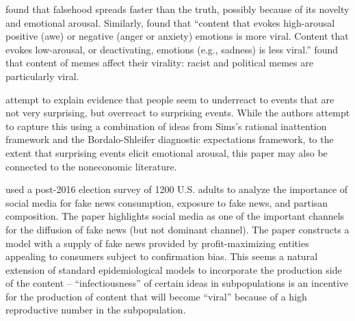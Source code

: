 

\href{https://science.sciencemag.org/content/359/6380/1146}{\cite{vosoughi_spread_2018}} found that falsehood spreads faster than the truth, possibly because of its novelty and emotional arousal.  Similarly, \href{https://journals.sagepub.com/doi/10.1509/jmr.10.0353}{\cite{berger2012makes}} found that ``content that evokes high-arousal positive (awe) or negative (anger or anxiety) emotions is more viral. Content that evokes low-arousal, or deactivating, emotions (e.g., sadness) is less viral.'' \href{https://arxiv.org/abs/1805.12512}{\cite{zannettou2018origins}} found that content of memes affect their virality: racist and political memes are particularly viral.

\cite{kohlhasasymmetric} attempt to explain evidence that people seem to underreact to events that are not very surprising, but overreact to surprising events.  While the authors attempt to capture this using a combination of ideas from Sims's rational inattention framework and the Bordalo-Shleifer diagnostic expectations framework, to the extent that surprising events elicit emotional arousal, this paper may also be connected to the noneconomic literature.  %


\href{https://github.com/iworld1991/EpiExp/blob/master/Literature/allcott2017social.pdf}{\cite{allcott2017social}} used a post-2016 election survey of 1200 U.S. adults to analyze the importance of social media for fake news consumption, exposure to fake news, and partisan composition. The paper highlights social media as one of the important channels for the diffusion of fake news (but not dominant channel).  The paper constructs a model with a supply of fake news provided by profit-maximizing entities appealing to consumers subject to confirmation bias. This seems a natural extension of standard epidemiological models to incorporate the production side of the content -- ``infectiousness'' of certain ideas in subpopulations is an incentive for the production of content that will become ``viral'' because of a high reproductive number in the subpopulation.

